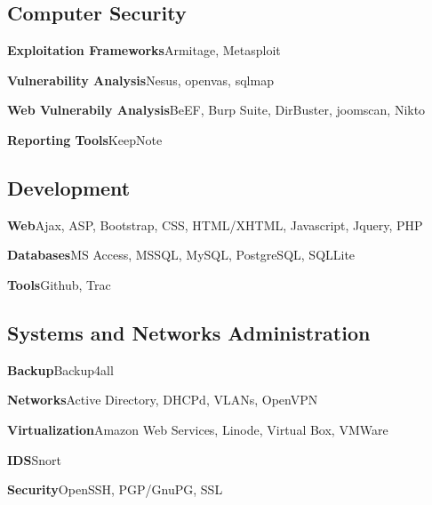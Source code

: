 \documentclass[11pt,a4paper,sans]{moderncv/moderncv}        %
\begin{document}
\subsection{Computer Security}
            {\textbf{Exploitation Frameworks}}{Armitage, Metasploit}

            {\textbf{Vulnerability Analysis}}{Nesus, openvas, sqlmap}

            {\textbf{Web Vulnerabily Analysis}}{BeEF, Burp Suite, DirBuster, joomscan, Nikto}

            {\textbf{Reporting Tools}}{KeepNote}

\subsection{Development}
            {\textbf{Web}}{Ajax, ASP, Bootstrap, CSS, HTML/XHTML, Javascript, Jquery, PHP}
           
            {\textbf{Databases}}{MS Access, MSSQL, MySQL, PostgreSQL, SQLLite}

            {\textbf{Tools}}{Github, Trac}

\subsection{Systems and Networks Administration}
            {\textbf{Backup}}{Backup4all}

            {\textbf{Networks}}{Active Directory, DHCPd, VLANs, OpenVPN}

            {\textbf{Virtualization}}{Amazon Web Services, Linode, Virtual Box, VMWare}
           
            {\textbf{IDS}}{Snort}

            {\textbf{Security}}{OpenSSH, PGP/GnuPG, SSL}
           
\end{document}
